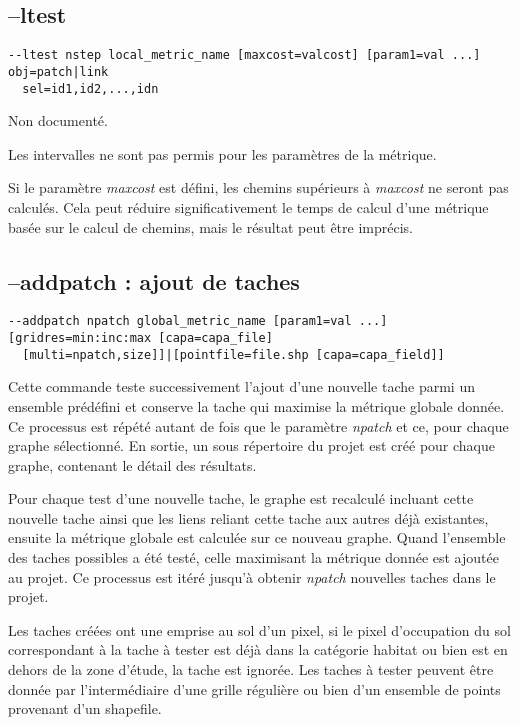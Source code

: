 \documentclass[a4paper,10pt]{report}
\begin{document}
\subsection{--ltest}
\begin{verbatim}
--ltest nstep local_metric_name [maxcost=valcost] [param1=val ...] obj=patch|link 
  sel=id1,id2,...,idn
\end{verbatim}

Non documenté.

Les intervalles ne sont pas permis pour les paramètres de la métrique.

Si le paramètre \textit{maxcost} est défini, les chemins supérieurs à \textit{maxcost} ne seront pas calculés. 
Cela peut réduire significativement le temps de calcul d'une métrique basée sur le calcul de chemins, mais le résultat peut être imprécis.

\subsection{--addpatch : ajout de taches}
\begin{verbatim}
--addpatch npatch global_metric_name [param1=val ...] [gridres=min:inc:max [capa=capa_file] 
  [multi=npatch,size]]|[pointfile=file.shp [capa=capa_field]]
\end{verbatim}

Cette commande teste successivement l'ajout d'une nouvelle tache parmi un ensemble prédéfini et conserve la tache qui maximise la métrique globale donnée. 
Ce processus est répété autant de fois que le paramètre \textit{npatch} et ce, pour chaque graphe sélectionné. 
En sortie, un sous répertoire du projet est créé pour chaque graphe, contenant le détail des résultats.

Pour chaque test d'une nouvelle tache, le graphe est recalculé incluant cette nouvelle tache ainsi que les liens reliant cette tache aux autres déjà existantes, ensuite la métrique globale est calculée sur ce nouveau graphe. Quand l'ensemble des taches possibles a été testé, celle maximisant la métrique donnée est ajoutée au projet. Ce processus est itéré jusqu'à obtenir \textit{npatch} nouvelles taches dans le projet.

Les taches créées ont une emprise au sol d'un pixel, si le pixel d'occupation du sol correspondant à la tache à tester est déjà dans la catégorie habitat ou bien est en dehors de la zone d'étude, la tache est ignorée. 
Les taches à tester peuvent être donnée par l'intermédiaire d'une grille régulière ou bien d'un ensemble de points provenant d'un shapefile.
\end{document}
